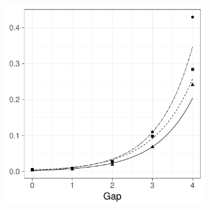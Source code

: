 \begin{figure}[htbp]
\begin{subfigure}[b]{0.49\textwidth}
        \includegraphics[width=\textwidth]{results/by_pop_risk_distance/RMISE-vs-population-risk-gap}
        \caption{}
        \label{fig:ise:p1.4_100_Gap_risk:rmise}
    \end{subfigure}


\end{figure}
